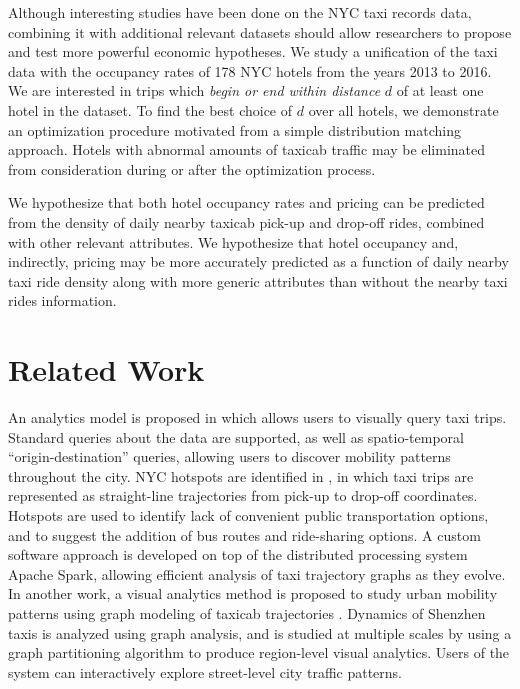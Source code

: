 \documentclass[useAMS, referee, usenatbib]{biom}
\begin{document}
Although interesting studies have been done on the NYC taxi records data, combining it with additional relevant datasets should allow researchers to propose and test more powerful economic hypotheses. We study a unification of the taxi data with the occupancy rates of 178 NYC hotels from the years 2013 to 2016. We are interested in trips which \textit{begin or end within distance} $d$ of at least one hotel in the dataset. To find the best choice of $d$ over all hotels, we demonstrate an optimization procedure motivated from a simple distribution matching approach. Hotels with abnormal amounts of taxicab traffic may be eliminated from consideration during or after the optimization process.

We hypothesize that both hotel occupancy rates and pricing can be predicted from the density of daily nearby taxicab pick-up and drop-off rides, combined with other relevant attributes. We hypothesize that hotel occupancy and, indirectly, pricing may be more accurately predicted as a function of daily nearby taxi ride density along with more generic attributes than without the nearby taxi rides information.

\section{Related Work}
\label{s:related}

An analytics model is proposed in \citet{Ferreira2013VisualEO} which allows users to visually query taxi trips. Standard queries about the data are supported, as well as spatio-temporal ``origin-destination'' queries, allowing users to discover mobility patterns throughout the city. NYC hotspots are identified in \citet{Stoyanovich2017ZoomingIO}, in which taxi trips are represented as straight-line trajectories from pick-up to drop-off coordinates. Hotspots are used to identify lack of convenient public transportation options, and to suggest the addition of bus routes and ride-sharing options. A custom software approach is developed on top of the distributed processing system Apache Spark, allowing efficient analysis of taxi trajectory graphs as they evolve. In another work, a visual analytics method is proposed to study urban mobility patterns using graph modeling of taxicab trajectories \citep{Huang2016TrajGraphAG}. Dynamics of Shenzhen taxis is analyzed using graph analysis, and is studied at multiple scales by using a graph partitioning algorithm to produce region-level visual analytics. Users of the system can interactively explore street-level city traffic patterns. 
\end{document}
